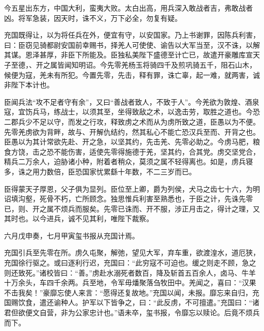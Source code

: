 \documentclass[12pt,UTF8]{ctexbook}
\begin{document}
今五星出东方，中国大利，蛮夷大败。太白出高，用兵深入敢战者吉，弗敢战者凶。将军急装，因天时，诛不义，万下必全，勿复有疑。



充国既得让，以为将任兵在外，便宜有守，以安国家。乃上书谢罪，因陈兵利害，曰：臣窃见骑都尉安国前幸赐书，择羌人可使使、谕告以大军当至，汉不诛，以解其谋。恩泽甚厚，非臣下所能及。臣独私美陛下盛德至计亡已，故遣开豪雕库宣天子至德，、开之属皆闻知明诏。今先零羌杨玉将骑四千及煎巩骑五千，阻石山木，候便为寇，羌未有所犯。今置先零，先击，释有罪，诛亡辜，起一难，就两害，诚非陛下本计也。



臣闻兵法“攻不足者守有余”，又曰“善战者致人，不致于人”。今羌欲为敦煌、酒泉寇，宜饬兵马，练战士，以须其至，坐得致敌之术，以逸击劳，取胜之道也。今恐二郡兵少不足以守，而发之行攻，释致虏之术而从为虏所致之道，臣愚以为不便。先零羌虏欲为背畔，故与、开解仇结约，然其私心不能亡恐汉兵至而、开背之也。臣愚以为其计常欲先赴、开之急，以坚其约，先击羌、先零必助之。今虏马肥，粮食方饶，击之恐不能伤害，适使先零得施德于羌，坚其约，合其党。虏交坚党合，精兵二万余人，迫胁诸小种，附着者稍众，莫须之属不轻得离也。如是，虏兵寝多，诛之用力数倍，臣恐国家忧累繇十年数，不二三岁而已。



臣得蒙天子厚恩，父子俱为显列。臣位至上卿，爵为列侯，犬马之齿七十六，为明诏填沟壑，死骨不朽，亡所顾念。独思惟兵利害至熟悉也，于臣之计，先诛先零已，则、开之属不烦兵而服矣。先零已诛而、开不服，涉正月击之，得计之理，又其时也。以今进兵，诚不见其利，唯陛下裁察。



六月戊申奏，七月甲寅玺书报从充国计焉。



充国引兵至先零在所。虏久屯聚，解弛，望见大军，弃车重，欲渡湟水，道厄狭，充国徐行驱之。或曰逐利行迟，充国曰：“此穷寇不可迫也。缓之则走不顾，急之则还致死。”诸校皆曰：“善。”虏赴水溺死者数百，降及斩首五百余人，卤马、牛羊十万余头，车四千余两。兵至地，令军毋燔聚落刍牧田中。羌闻之，喜曰：“汉果不击我矣！”豪靡忘使人来言：“愿得还复故地。”充国以闻，未报。靡忘来自归，充国赐饮食，遣还谕种人。护军以下皆争之，曰：“此反虏，不可擅遣。”充国曰：“诸君但欲便文自营，非为公家忠计也。”语未卒，玺书报，令靡忘以赎论。后竟不烦兵而下。
\end{document}
